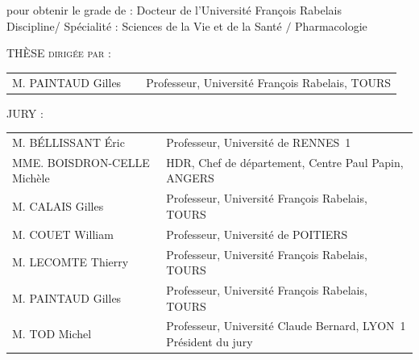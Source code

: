 \vspace{.5cm}
	
\begin{minipage}{16cm}
	\begin{center}
		pour obtenir le grade de : Docteur de l'Université François Rabelais \\ \vspace{0.2cm}
		Discipline/ Spécialité : Sciences de la Vie et de la Santé $/$ Pharmacologie
	\end{center}
\end{minipage}
	
\vspace{0.3cm}


\vspace{1cm}
		 
\textsc{\large THÈSE dirigée par : } $\ $ \vspace{0.2cm}\\ 
\begin{tabular}{l p{2cm} p{8cm}}
	\textsc{M. PAINTAUD}  Gilles & $\ $ &  Professeur, Université François Rabelais, TOURS\\
\end{tabular}

\vspace{0.3cm}

\textsc{JURY : }  $\ $ \vspace{0.2cm} \\
\begin{tabular}{l  p{10cm}}
	\textsc{M. BÉLLISSANT}  Éric &  Professeur, Université de RENNES~1\\
	\textsc{MME. BOISDRON-CELLE}  Michèle &   HDR, Chef de département, Centre Paul Papin, ANGERS\\
	\textsc{M. CALAIS}  Gilles &   Professeur, Université François Rabelais, TOURS\\
	\textsc{M. COUET}  William &   Professeur, Université de POITIERS\\
	\textsc{M. LECOMTE}  Thierry &   Professeur, Université François Rabelais, TOURS\\
	\textsc{M. PAINTAUD}  Gilles &   Professeur, Université François Rabelais, TOURS\\
	\textsc{M. TOD}  Michel &   Professeur, Université Claude Bernard, LYON~1 Président du jury\\
\end{tabular}
\setlength{\voffset}{0pt}

